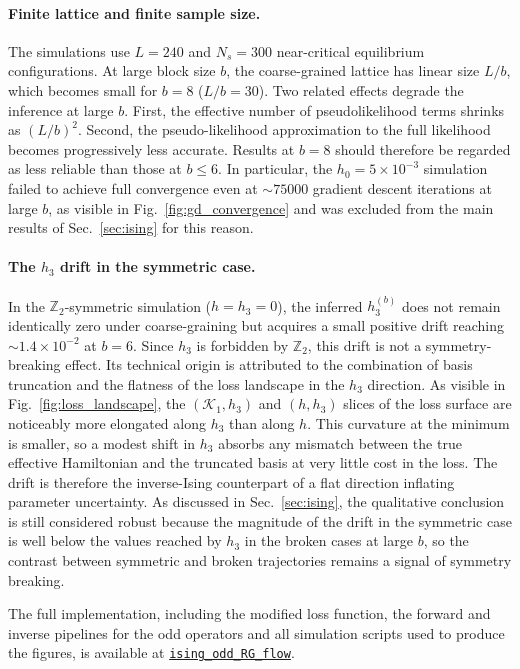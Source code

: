\documentclass[a4paper, 11pt]{article}
\begin{document}
\paragraph{Finite lattice and finite sample size.}
The simulations use $L=240$ and $N_s=300$ near-critical equilibrium configurations. At large block size $b$, the coarse-grained lattice has linear size $L/b$, which becomes small for $b=8$ ($L/b=30$). Two related effects degrade the inference at large $b$. First, the effective number of pseudolikelihood terms shrinks as $(L/b)^2$. Second, the pseudo-likelihood approximation to the full likelihood becomes progressively less accurate. Results at $b=8$ should therefore be regarded as less reliable than those at $b\le6$. In particular, the $h_0=5\times10^{-3}$ simulation failed to achieve full convergence even at $\sim75000$ gradient descent iterations at large $b$, as visible in Fig.~\ref{fig:gd_convergence} and was excluded from the main results of Sec.~\ref{sec:ising} for this reason.

\paragraph{The $h_3$ drift in the symmetric case.}
In the $\mathbb{Z}_2$-symmetric simulation ($h=h_3=0$), the inferred $h_3^{(b)}$ does not remain identically zero under coarse-graining but acquires a small positive drift reaching $\sim1.4\times10^{-2}$ at $b=6$. Since $h_3$ is forbidden by $\mathbb{Z}_2$, this drift is not a symmetry-breaking effect. Its technical origin is attributed to the combination of basis truncation and the flatness of the loss landscape in the $h_3$ direction. As visible in Fig.~\ref{fig:loss_landscape}, the $(\mathcal{K}_1,h_3)$ and $(h,h_3)$ slices of the loss surface are noticeably more elongated along $h_3$ than along $h$. This curvature at the minimum is smaller, so a modest shift in $h_3$ absorbs any mismatch between the true effective Hamiltonian and the truncated basis at very little cost in the loss. The drift is therefore the inverse-Ising counterpart of a flat direction inflating parameter uncertainty. As discussed in Sec.~\ref{sec:ising}, the qualitative conclusion is still considered robust because the magnitude of the drift in the symmetric case is well below the values reached by $h_3$ in the broken cases at large $b$, so the contrast between symmetric and broken trajectories remains a signal of symmetry breaking.

\bigskip
\noindent
The full implementation, including the modified loss function, the
forward and inverse pipelines for the odd operators and all
simulation scripts used to produce the figures, is available at
\href{https://github.com/juanagranadosr/ising_odd_RG_flow}%
{\texttt{ising\_odd\_RG\_flow}}.
\end{document}
